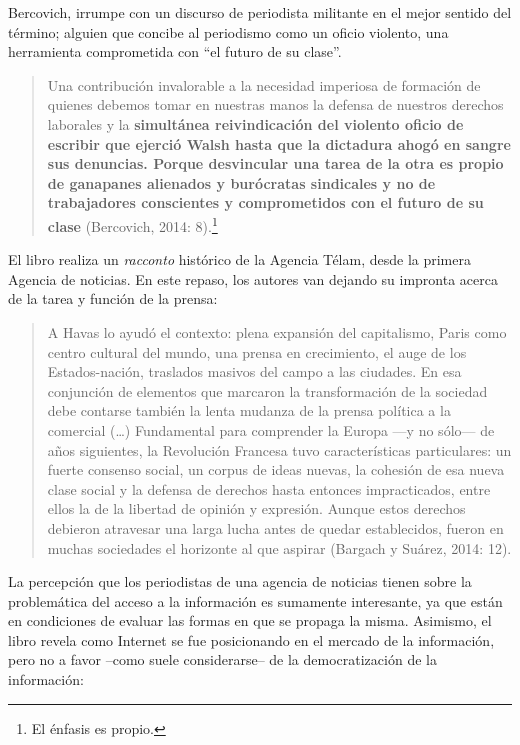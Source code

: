 {Bercovich, irrumpe con un discurso de periodista militante en el mejor sentido del término; alguien que concibe al periodismo como un oficio violento, una herramienta comprometida con ``el futuro de su clase''.

\begin{quote}
Una contribución invalorable a la necesidad imperiosa de formación de quienes debemos tomar en nuestras manos la defensa de nuestros derechos laborales y la \textbf{simultánea reivindicación del violento oficio de escribir que ejerció Walsh hasta que la dictadura ahogó en sangre sus denuncias. Porque desvincular una tarea de la otra es propio de ganapanes alienados y burócratas sindicales y no de trabajadores conscientes y comprometidos con el futuro de su clase} (Bercovich, 2014: 8).\footnote{El énfasis es propio.}
\end{quote}

El libro realiza un \emph{racconto} histórico de la Agencia Télam, desde la primera Agencia de noticias. En este repaso, los autores van dejando su impronta acerca de la tarea y función de la prensa:

\begin{quote}
A Havas lo ayudó el contexto: plena expansión del capitalismo, Paris como centro cultural del mundo, una prensa en crecimiento, el auge de los Estados-nación, traslados masivos del campo a las ciudades. En esa conjunción de elementos que marcaron la transformación de la sociedad debe contarse también la lenta mudanza de la prensa política a la comercial (\ldots) Fundamental para comprender la Europa ---y no sólo--- de años siguientes, la Revolución Francesa tuvo características particulares: un fuerte consenso social, un corpus de ideas nuevas, la cohesión de esa nueva clase social y la defensa de derechos hasta entonces impracticados, entre ellos la de la libertad de opinión y expresión. Aunque estos derechos debieron atravesar una larga lucha antes de quedar establecidos, fueron en muchas sociedades el horizonte al que aspirar (Bargach y Suárez, 2014: 12).
\end{quote}

La percepción que los periodistas de una agencia de noticias tienen sobre la problemática del acceso a la información es sumamente interesante, ya que están en condiciones de evaluar las formas en que se propaga la misma. Asimismo, el libro revela como Internet se fue posicionando en el mercado de la información, pero no a favor --como suele considerarse-- de la democratización de la información:

}
